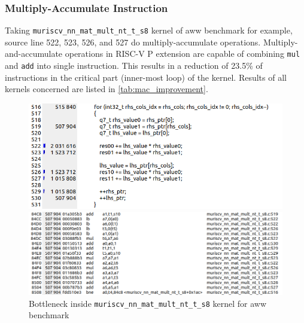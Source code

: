 \subsubsection{Multiply-Accumulate Instruction}
Taking \texttt{muriscv\_nn\_mat\_mult\_nt\_t\_s8} kernel of aww benchmark for example, source line 522, 523, 526, and 527 do multiply-accumulate operations. Multiply-and-accumulate operations in RISC-V P extension are capable of combining \texttt{mul} and \texttt{add} into single instruction. This results in a reduction of 23.5\% of instructions in the critical part (inner-most loop) of the kernel. Results of all kernels concerned are listed in \cref{tab:mac_improvement}.

\begin{figure}[ht]
    \centering
    \begin{minipage}{0.45\textwidth}
        \centering
        \includegraphics[width=\textwidth]{figures/aww_bottleneck_source_1.png}
    \end{minipage}\hfill
    \begin{minipage}{0.54\textwidth}
        \centering
        \includegraphics[width=\textwidth]{figures/aww_bottleneck_assembly_1.png}
    \end{minipage}
    \caption{Bottleneck inside \texttt{muriscv\_nn\_mat\_mult\_nt\_t\_s8} kernel for aww benchmark}
    \label{fig:aww_bottleneck}
\end{figure}


